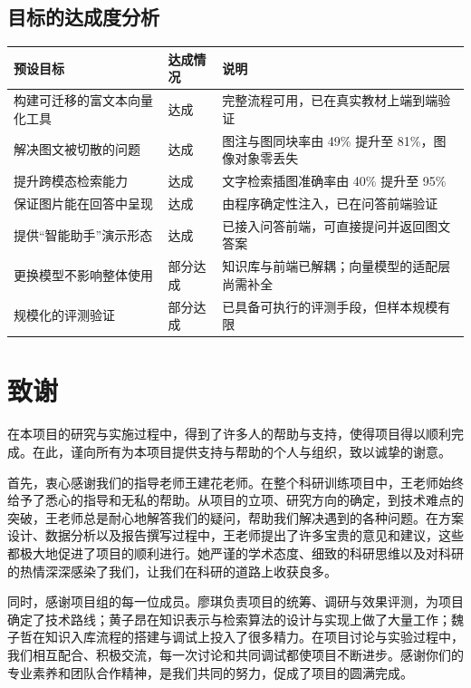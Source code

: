 \documentclass[12pt,a4paper]{ctexart}
\begin{document}
\subsection{目标的达成度分析}

\begin{table}[H]
\centering
\small
\begin{tabular}{@{}p{6.0cm}p{2.3cm}p{6.2cm}@{}}
\toprule
\textbf{预设目标} & \textbf{达成情况} & \textbf{说明} \\
\midrule
构建可迁移的富文本向量化工具 & 达成 & 完整流程可用，已在真实教材上端到端验证 \\
\addlinespace
解决图文被切散的问题 & 达成 & 图注与图同块率由 49\% 提升至 81\%，图像对象零丢失 \\
\addlinespace
提升跨模态检索能力 & 达成 & 文字检索插图准确率由 40\% 提升至 95\% \\
\addlinespace
保证图片能在回答中呈现 & 达成 & 由程序确定性注入，已在问答前端验证 \\
\addlinespace
提供“智能助手”演示形态 & 达成 & 已接入问答前端，可直接提问并返回图文答案 \\
\addlinespace
更换模型不影响整体使用 & 部分达成 & 知识库与前端已解耦；向量模型的适配层尚需补全 \\
\addlinespace
规模化的评测验证 & 部分达成 & 已具备可执行的评测手段，但样本规模有限 \\
\bottomrule
\end{tabular}
\end{table}

\section{致谢}

在本项目的研究与实施过程中，得到了许多人的帮助与支持，使得项目得以顺利完成。在此，谨向所有为本项目提供支持与帮助的个人与组织，致以诚挚的谢意。

首先，衷心感谢我们的指导老师王建花老师。在整个科研训练项目中，王老师始终给予了悉心的指导和无私的帮助。从项目的立项、研究方向的确定，到技术难点的突破，王老师总是耐心地解答我们的疑问，帮助我们解决遇到的各种问题。在方案设计、数据分析以及报告撰写过程中，王老师提出了许多宝贵的意见和建议，这些都极大地促进了项目的顺利进行。她严谨的学术态度、细致的科研思维以及对科研的热情深深感染了我们，让我们在科研的道路上收获良多。

同时，感谢项目组的每一位成员。廖琪负责项目的统筹、调研与效果评测，为项目确定了技术路线；黄子昂在知识表示与检索算法的设计与实现上做了大量工作；魏子哲在知识入库流程的搭建与调试上投入了很多精力。在项目讨论与实验过程中，我们相互配合、积极交流，每一次讨论和共同调试都使项目不断进步。感谢你们的专业素养和团队合作精神，是我们共同的努力，促成了项目的圆满完成。
\end{document}
